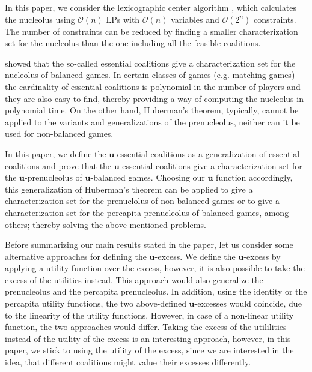 \documentclass[a4paper,12pt]{article}
\theoremstyle{definition}
\theoremstyle{remark}
\begin{document}
In this paper, we consider the lexicographic center algorithm \citep{MaschlerPelegShapley1979}, which calculates the nucleolus using $\mathcal{O} (n)$ LPs with $\mathcal{O} (n)$ variables and $\mathcal{O} (2^n)$ constraints. The number of constraints can be reduced by finding a smaller characterization set for the nucleolus than the one including all the feasible coalitions. 


\citet{Huberman1980} showed that the so-called essential coalitions give a characterization set for the nucleolus of balanced games. In certain classes of games (e.g. matching-games) the cardinality of essential coalitions is polynomial in the number of players and they are also easy to find, thereby providing a way of computing the nucleolus in polynomial time. On the other hand, Huberman's theorem, typically, cannot be applied to the variants and generalizations of the prenucleolus, neither can it be used for non-balanced games.

In this paper, we define the $\mathbf{u}$-essential coalitions as a generalization of essential coalitions and prove that the $\mathbf{u}$-essential coalitions give a characterization set for the $\mathbf{u}$-prenucleolus of $\mathbf{u}$-balanced games. Choosing our $\mathbf{u}$ function accordingly, this generalization of Huberman's theorem can be applied to give a characterization set for the prenuclolus of non-balanced games or to give a characterization set for the percapita prenucleolus of balanced games, among others; thereby solving the above-mentioned problems.

Before summarizing our main results stated in the paper, let us consider some alternative approaches for defining the $\mathbf{u}$-excess. We define the $\mathbf{u}$-excess by applying a utility function over the excess, however, it is also possible to take the excess of the utilities instead. This approach would also generalize the prenucleolus and the percapita prenucleolus. In addition, using the identity or the percapita utility functions, the two above-defined $\mathbf{u}$-excesses would coincide, due to the linearity of the utility functions. However, in case of a non-linear utility function, the two approaches would differ. Taking the excess of the utililities instead of the utility of the excess is an interesting approach, however, in this paper, we stick to using the utility of the excess, since we are interested in the idea, that different coalitions might value their excesses differently. 
\end{document}

